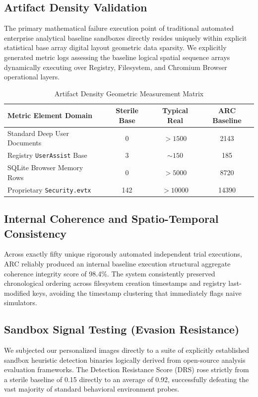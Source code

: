 \documentclass{ieeeaccess}
\begin{document}
\subsection{Artifact Density Validation}
The primary mathematical failure execution point of traditional automated enterprise analytical baseline sandboxes directly resides uniquely within explicit statistical base array digital layout geometric data sparsity. We explicitly generated metric logs assessing the baseline logical spatial sequence arrays dynamically executing over Registry, Filesystem, and Chromium Browser operational layers.

\begin{table}[htbp]
\caption{Artifact Density Geometric Measurement Matrix}
\centering
\begin{tabular}{lccc}
\toprule
\textbf{Metric Element Domain} & \textbf{Sterile Base} & \textbf{Typical Real} & \textbf{ARC Baseline} \\
\midrule
Standard Deep User Documents & 0 & $> 1500$ & 2143 \\
Registry \texttt{UserAssist} Base & 3 & $\sim 150$ & 185 \\
SQLite Browser Memory Rows & 0 & $> 5000$ & 8720 \\
Proprietary \texttt{Security.evtx} & 142 & $> 10000$ & 14390 \\
\bottomrule
\end{tabular}
\end{table}

\subsection{Internal Coherence and Spatio-Temporal Consistency}
Across exactly fifty unique rigorously automated independent trial executions, ARC reliably produced an internal baseline execution structural aggregate coherence integrity score of 98.4\%. The system consistently preserved chronological ordering across filesystem creation timestamps and registry last-modified keys, avoiding the timestamp clustering that immediately flags naive simulators.

\subsection{Sandbox Signal Testing (Evasion Resistance)}
We subjected our personalized images directly to a suite of explicitly established sandbox heuristic detection binaries logically derived from open-source analysis evaluation frameworks. The Detection Resistance Score (DRS) rose strictly from a sterile baseline of 0.15 directly to an average of 0.92, successfully defeating the vast majority of standard behavioral environment probes.
\end{document}
